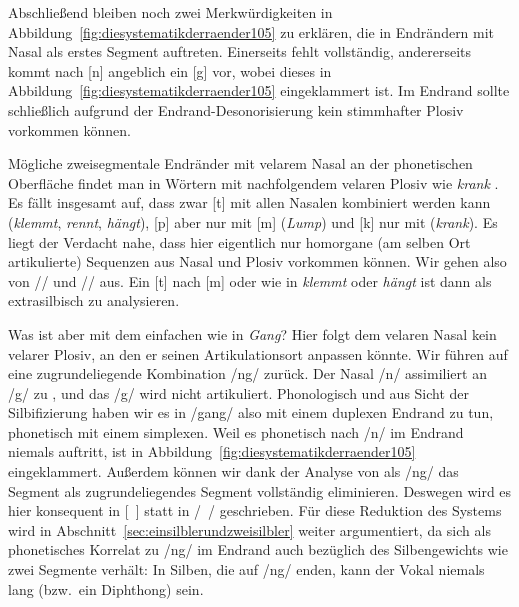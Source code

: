 \begin{exe}
  \ex \label{ex:diesystematikderraender117}
  \begin{xlist}
  \end{xlist}
\end{exe}

Abschließend bleiben noch zwei Merkwürdigkeiten in Abbildung~\ref{fig:diesystematikderraender105} zu erklären, die in Endrändern mit Nasal als erstes Segment auftreten.
Einerseits fehlt \textipa{[N]} vollständig, andererseits kommt nach [n] angeblich ein [g] vor, wobei dieses in Abbildung~\ref{fig:diesystematikderraender105} eingeklammert ist.
Im Endrand sollte schließlich aufgrund der Endrand-Desonorisierung kein stimmhafter Plosiv vorkommen können.

Mögliche zweisegmentale Endränder mit velarem Nasal \textipa{[N]} an der phonetischen Oberfläche findet man in Wörtern mit nachfolgendem velaren Plosiv wie \textit{krank} \textipa{[kKaNk]}.
Es fällt insgesamt auf, dass zwar [t] mit allen Nasalen kombiniert werden kann (\textit{klemmt}, \textit{rennt}, \textit{hängt}), [p] aber nur mit [m] (\textit{Lump}) und [k] nur mit \textipa{[N]} (\textit{krank}).
Es liegt der Verdacht nahe, dass hier eigentlich nur homorgane (am selben Ort artikulierte) Sequenzen aus Nasal und Plosiv vorkommen können.
Wir gehen also von // \phopro \textipa{[kKaNk]} und // \phopro \textipa{[lUmp]} aus.
Ein [t] nach [m] oder \textipa{[N]} wie in \textit{klemmt} oder \textit{hängt} ist dann als extrasilbisch zu analysieren.

Was ist aber mit dem einfachen \textipa{[N]} wie in \textit{Gang}?
Hier folgt dem velaren Nasal kein velarer Plosiv, an den er seinen Artikulationsort anpassen könnte.
Wir führen \textipa{[N]} auf eine zugrundeliegende Kombination /ng/ zurück.
Der Nasal /n/ assimiliert an /g/ zu \textipa{[N]}, und das /g/ wird nicht artikuliert.
Phonologisch und aus Sicht der Silbifizierung haben wir es \zB in /gang/ also mit einem duplexen Endrand zu tun, phonetisch mit einem simplexen.
Weil es phonetisch nach /n/ im Endrand niemals auftritt, ist \textipa{[g]} in Abbildung~\ref{fig:diesystematikderraender105} eingeklammert.
Außerdem können wir dank der Analyse von \textipa{[N]} als /ng/ das Segment \textipa{[N]} als zugrundeliegendes Segment vollständig eliminieren.
Deswegen wird es hier konsequent in [~] statt in /~/ geschrieben.
Für diese Reduktion des Systems wird in Abschnitt~\ref{sec:einsilblerundzweisilbler} weiter argumentiert, da sich \textipa{[N]} als phonetisches Korrelat zu /ng/ im Endrand auch bezüglich des Silbengewichts wie zwei Segmente verhält:
In Silben, die auf /ng/ enden, kann der Vokal niemals lang (bzw.\ ein Diphthong) sein.

